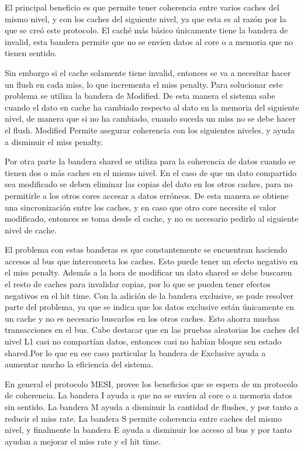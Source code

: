 \documentclass {article}
\begin{document}
El principal beneficio es que permite tener coherencia entre varios caches del mismo nivel, y con
los caches del siguiente nivel, ya que esta es al razón por la que se creó este protocolo. El caché
más básico únicamente tiene la bandera de invalid, esta bandera permite que no se envíen datos al
core o a memoria que no tienen sentido.

Sin embargo si el cache solamente tiene invalid, entonces se
va a necesitar hacer un flush en cada miss, lo que incrementa el miss penalty. Para solucionar este
problema se utiliza la bandera de Modified. De esta manera el sistema sabe cuando el dato en cache
ha cambiado respecto al dato en la memoria del siguiente nivel, de manera que si no ha cambiado,
cuando suceda un miss no se debe hacer el flush. Modified Permite asegurar coherencia con los
siguientes niveles, y ayuda a disminuir el miss penalty.

Por otra parte la bandera shared se utiliza para la coherencia de datos cuando se tienen dos o más
caches en el mismo nivel. En el caso de que un dato compartido sea modificado se deben eliminar las
copias del dato en los otros caches, para no permitirle a los otros cores accesar a datos
erróneos. De esta manera se obtiene una sincronización entre los caches, y en caso que otro core
necesite el valor modificado, entonces se toma desde el cache, y no es necesario pedirlo al
siguiente nivel de cache.

El problema con estas banderas es que constantemente se encuentran haciendo accesos al bus que
interconecta los caches. Esto puede tener un efecto negativo en el miss penalty. Además a la hora de
modificar un dato shared se debe buscaren el resto de caches para invalidar copias, por lo que se
pueden tener efectos negativos en el hit time. Con la adición de la bandera exclusive, se pude
resolver parte del problema, ya que se indica que los datos exclusive están únicamente en un cache y
no es necesario buscarlos en los otros caches. Esto ahorra muchas transacciones en el bus. Cabe
destacar que en las pruebas aleatorias los caches del nivel L1 casi no compartían datos, entonces casi
no habían bloque sen estado shared.Por lo que en ese caso particular la bandera de Exclusive ayuda a
aumentar mucho la eficiencia del sistema.

En general el protocolo MESI, provee los beneficios que se espera de un protocolo de coherencia. La
bandera I ayuda a que no se envíen al core o a memoria datos sin sentido. La bandera M ayuda a
disminuir la cantidad de flushes, y por tanto a reducir el miss rate. La bandera S permite
coherencia entre caches del mismo nivel, y finalmente la bandera E ayuda a disminuir los acceso al
bus y por tanto ayudan a mejorar el miss rate y el hit time.
\end{document}
